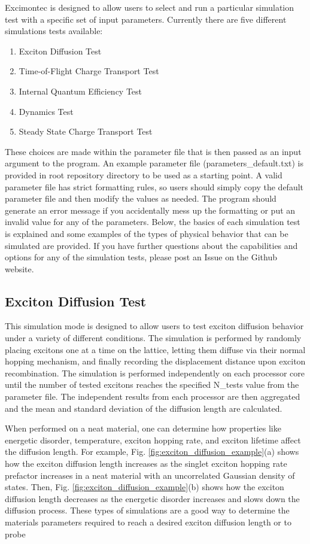 \documentclass[%
 reprint,onecolumn,notitlepage,
superscriptaddress,longbibliography,
 amsmath,amssymb,
 aps,rmp,floatfix,
]{revtex4-1}
\begin{document}
Excimontec is designed to allow users to select and run a particular simulation test with a specific set of input parameters.
Currently there are five different simulations tests available:
\begin{enumerate}
    \item Exciton Diffusion Test
    \item Time-of-Flight Charge Transport Test
    \item Internal Quantum Efficiency Test
    \item Dynamics Test
    \item Steady State Charge Transport Test
\end{enumerate}
These choices are made within the parameter file that is then passed as an input argument to the program.
An example parameter file (parameters\_default.txt) is provided in root repository directory to be used as a starting point.
A valid parameter file has strict formatting rules, so users should simply copy the default parameter file and then modify the values as needed.
The program should generate an error message if you accidentally mess up the formatting or put an invalid value for any of the parameters.
Below, the basics of each simulation test is explained and some examples of the types of physical behavior that can be simulated are provided.
If you have further questions about the capabilities and options for any of the simulation tests, please post an Issue on the Github website.

\subsection{Exciton Diffusion Test}

This simulation mode is designed to allow users to test exciton diffusion behavior under a variety of different conditions.
The simulation is performed by randomly placing excitons one at a time on the lattice, letting them diffuse via their normal hopping mechanism, and finally recording the displacement distance upon exciton recombination.
The simulation is performed independently on each processor core until the number of tested excitons reaches the specified N\_tests value from the parameter file.
The independent results from each processor are then aggregated and the mean and standard deviation of the diffusion length are calculated.

When performed on a neat material, one can determine how properties like energetic disorder, temperature, exciton hopping rate, and exciton lifetime affect the diffusion length.
For example, Fig. \ref{fig:exciton_diffusion_example}(a) shows how the exciton diffusion length increases as the singlet exciton hopping rate prefactor increases in a neat material with an uncorrelated Gaussian density of states.
Then, Fig. \ref{fig:exciton_diffusion_example}(b) shows how the exciton diffusion length decreases as the energetic disorder increases and slows down the diffusion process.
These types of simulations are a good way to determine the materials parameters required to reach a desired exciton diffusion length or to probe 
\end{document}
